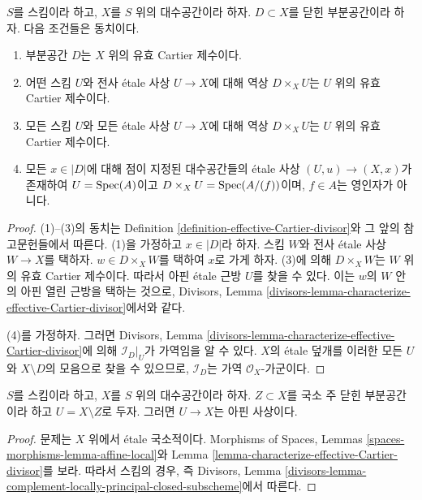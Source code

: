 \begin{lemma}
\label{lemma-characterize-effective-Cartier-divisor}
$S$를 스킴이라 하고, $X$를 $S$ 위의 대수공간이라 하자.
$D \subset X$를 닫힌 부분공간이라 하자. 다음 조건들은 동치이다.
\begin{enumerate}
\item 부분공간 $D$는 $X$ 위의 유효 Cartier 제수이다.
\item 어떤 스킴 $U$와 전사 \'etale 사상 $U \to X$에 대해 역상
$D \times_X U$는 $U$ 위의 유효 Cartier 제수이다.
\item 모든 스킴 $U$와 모든 \'etale 사상 $U \to X$에 대해 역상
$D \times_X U$는 $U$ 위의 유효 Cartier 제수이다.
\item 모든 $x \in |D|$에 대해 점이 지정된 대수공간들의 \'etale 사상
$(U, u) \to (X, x)$가 존재하여 $U = \mathop{\mathrm{Spec}}(A)$이고
$D \times_X U = \mathop{\mathrm{Spec}}(A/(f))$이며, $f \in A$는 영인자가 아니다.
\end{enumerate}
\end{lemma}

\begin{proof}
(1)--(3)의 동치는 Definition
\ref{definition-effective-Cartier-divisor}와 그 앞의 참고문헌들에서 따른다.
(1)을 가정하고 $x \in |D|$라 하자. 스킴 $W$와 전사 \'etale 사상
$W \to X$를 택하자. $w \in D \times_X W$를 택하여 $x$로 가게 하자.
(3)에 의해 $D \times_X W$는 $W$ 위의 유효 Cartier 제수이다. 따라서
아핀 \'etale 근방 $U$를 찾을 수 있다. 이는 $w$의 $W$ 안의 아핀 열린
근방을 택하는 것으로, Divisors, Lemma
\ref{divisors-lemma-characterize-effective-Cartier-divisor}에서와 같다.

\medskip\noindent
(4)를 가정하자. 그러면 Divisors, Lemma
\ref{divisors-lemma-characterize-effective-Cartier-divisor}에 의해
$\mathcal{I}_D|_U$가 가역임을 알 수 있다. $X$의 \'etale 덮개를 이러한
모든 $U$와 $X \setminus D$의 모음으로 찾을 수 있으므로,
$\mathcal{I}_D$는 가역 $\mathcal{O}_X$-가군이다.
\end{proof}

\begin{lemma}
\label{lemma-complement-locally-principal-closed-subscheme}
$S$를 스킴이라 하고, $X$를 $S$ 위의 대수공간이라 하자.
$Z \subset X$를 국소 주 닫힌 부분공간이라 하고 $U = X \setminus Z$로
두자. 그러면 $U \to X$는 아핀 사상이다.
\end{lemma}

\begin{proof}
문제는 $X$ 위에서 \'etale 국소적이다. Morphisms of Spaces, Lemmas
\ref{spaces-morphisms-lemma-affine-local}와 Lemma
\ref{lemma-characterize-effective-Cartier-divisor}를 보라. 따라서 스킴의 경우,
즉 Divisors, Lemma
\ref{divisors-lemma-complement-locally-principal-closed-subscheme}에서 따른다.
\end{proof}

